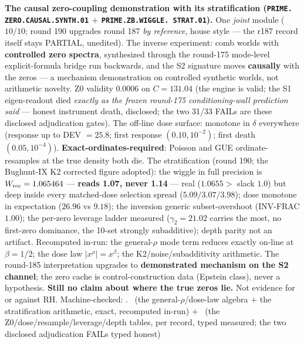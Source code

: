 \par\smallskip\noindent\textbf{The causal zero-coupling
demonstration with its stratification (\texttt{PRIME.\allowbreak
ZERO.\allowbreak CAUSAL.\allowbreak SYNTH.01} $+$
\texttt{PRIME.\allowbreak ZB.\allowbreak WIGGLE.\allowbreak
STRAT.01}).}
One \emph{joint} module ($10/10$; round 190 upgrades round 187
\emph{by reference}, house style --- the r187 record itself stays
PARTIAL, unedited).  The inverse experiment: comb worlds with
\textbf{controlled zero spectra}, synthesized through the
round-175 mode-level explicit-formula bridge run backwards, and
the S2 signature moves \textbf{causally} with the zeros --- a
mechanism demonstration on controlled synthetic worlds, not
arithmetic novelty.  Z0 validity $0.0006$ on $C = 131.04$ (the
engine is valid; the S1 eigen-readout died \emph{exactly as the
frozen round-175 conditioning-wall prediction said} --- honest
instrument death, disclosed; the two 31/33 FAILs are these
disclosed adjudication gates).  The off-line dose surface:
monotone in $\delta$ everywhere (response up to DEV $= 25.8$;
first response $(0.10, 10^{-2})$; first death $(0.05,
10^{-4})$).  \textbf{Exact-ordinates-required}: Poisson and GUE
ordinate-resamples at the true density both die.  The
stratification (round 190; the Bughunt-IX K2 corrected figure
adopted): the wiggle in full precision is $W_{\rm rec} =
1.065464$ --- \textbf{reads 1.07, never 1.14} --- real
($1.0655 >$ slack $1.0$) but deep inside every matched-dose
selection spread ($5.09/3.07/3.98$); dose monotone in
expectation ($26.96$ vs $9.18$); the inversion generic
subset-overshoot (INV-FRAC $1.00$); the per-zero leverage ladder
measured ($\gamma_2 = 21.02$ carries the most, no first-zero
dominance, the 10-set strongly subadditive); depth parity not an
artifact.  Recomputed in-run: the general-$\rho$ mode term
reduces exactly on-line at $\beta = 1/2$; the dose law
$|x^{\rho}| = x^{\beta}$; the K2/noise/subadditivity arithmetic.
The round-185 interpretation upgrades to \textbf{demonstrated
mechanism on the S2 channel}; the zero cache is
control-construction data (Epstein class), never a hypothesis.
\textbf{Still no claim about where the true zeros lie.}  Not
evidence for or against RH.
Machine-checked: .
\mE\ (the general-$\rho$/dose-law algebra $+$ the stratification
arithmetic, exact, recomputed in-run) $+$ \mC\ (the
Z0/dose/resample/leverage/depth tables, per record, typed
measured; the two disclosed adjudication FAILs typed honest)
\par\smallskip


